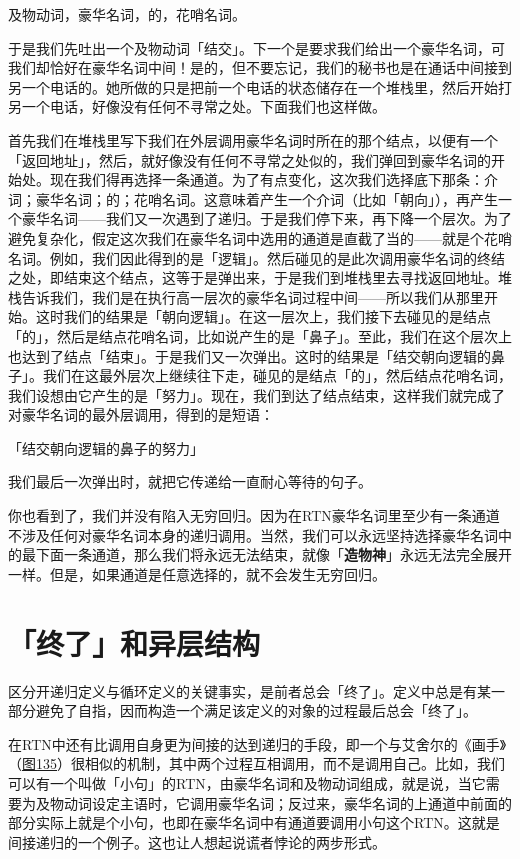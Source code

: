 \documentclass[
  12pt,
  twoside,
  openright,
  oldfontcommands,
]{memoir}
\newcommand{\heititext}[1]{{\heifamily\bfseries #1}}
\begin{document}
及物动词，豪华名词，的，花哨名词。

于是我们先吐出一个及物动词「结交」。下一个是要求我们给出一个豪华名词，可我们却恰好在豪华名词中间！是的，但不要忘记，我们的秘书也是在通话中间接到另一个电话的。她所做的只是把前一个电话的状态储存在一个堆栈里，然后开始打另一个电话，好像没有任何不寻常之处。下面我们也这样做。

首先我们在堆栈里写下我们在外层调用豪华名词时所在的那个结点，以便有一个「返回地址」，然后，就好像没有任何不寻常之处似的，我们弹回到豪华名词的开始处。现在我们得再选择一条通道。为了有点变化，这次我们选择底下那条：介词；豪华名词；的；花哨名词。这意味着产生一个介词（比如「朝向」），再产生一个豪华名词------我们又一次遇到了递归。于是我们停下来，再下降一个层次。为了避免复杂化，假定这次我们在豪华名词中选用的通道是直截了当的------就是个花哨名词。例如，我们因此得到的是「逻辑」。然后碰见的是此次调用豪华名词的终结之处，即结束这个结点，这等于是弹出来，于是我们到堆栈里去寻找返回地址。堆栈告诉我们，我们是在执行高一层次的豪华名词过程中间------所以我们从那里开始。这时我们的结果是「朝向逻辑」。在这一层次上，我们接下去碰见的是结点「的」，然后是结点花哨名词，比如说产生的是「鼻子」。至此，我们在这个层次上也达到了结点「结束」。于是我们又一次弹出。这时的结果是「结交朝向逻辑的鼻子」。我们在这最外层次上继续往下走，碰见的是结点「的」，然后结点花哨名词，我们设想由它产生的是「努力」。现在，我们到达了结点结束，这样我们就完成了对豪华名词的最外层调用，得到的是短语：

「结交朝向逻辑的鼻子的努力」

我们最后一次弹出时，就把它传递给一直耐心等待的句子。

你也看到了，我们并没有陷入无穷回归。因为在RTN豪华名词里至少有一条通道不涉及任何对豪华名词本身的递归调用。当然，我们可以永远坚持选择豪华名词中的最下面一条通道，那么我们将永远无法结束，就像「\heititext{造物神}」永远无法完全展开一样。但是，如果通道是任意选择的，就不会发生无穷回归。

\section{「终了」和异层结构}

区分开递归定义与循环定义的关键事实，是前者总会「终了」。定义中总是有某一部分避免了自指，因而构造一个满足该定义的对象的过程最后总会「终了」。

在RTN中还有比调用自身更为间接的达到递归的手段，即一个与艾舍尔的《画手》（\hyperref[fig:135]{图135}）很相似的机制，其中两个过程互相调用，而不是调用自己。比如，我们可以有一个叫做「小句」的RTN，由豪华名词和及物动词组成，就是说，当它需要为及物动词设定主语时，它调用豪华名词；反过来，豪华名词的上通道中前面的部分实际上就是个小句，也即在豪华名词中有通道要调用小句这个RTN。这就是间接递归的一个例子。这也让人想起说谎者悖论的两步形式。
\end{document}
